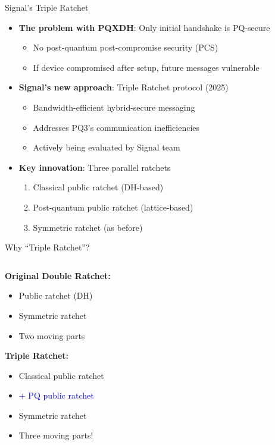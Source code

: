 \documentclass[aspectratio=169, lualatex, handout]{beamer}
\begin{document}
\begin{frame}{Signal's Triple Ratchet}
	\begin{itemize}
		\item \textbf{The problem with PQXDH}: Only initial handshake is PQ-secure
		      \begin{itemize}
			      \item No post-quantum post-compromise security (PCS)
			      \item If device compromised after setup, future messages vulnerable
		      \end{itemize}
		\item \textbf{Signal's new approach}: Triple Ratchet protocol (2025)
		      \begin{itemize}
			      \item Bandwidth-efficient hybrid-secure messaging
			      \item Addresses PQ3's communication inefficiencies
			      \item Actively being evaluated by Signal team
		      \end{itemize}
		\item \textbf{Key innovation}: Three parallel ratchets
		      \begin{enumerate}
			      \item Classical public ratchet (DH-based)
			      \item Post-quantum public ratchet (lattice-based)
			      \item Symmetric ratchet (as before)
		      \end{enumerate}
	\end{itemize}
\end{frame}

\begin{frame}{Why ``Triple Ratchet''?}
	\begin{columns}[c]
		\begin{column}{1\textwidth}
			\textbf{Original Double Ratchet:}
			\begin{itemize}
				\item Public ratchet (DH)
				\item Symmetric ratchet
				\item Two moving parts
			\end{itemize}
			\vspace{5mm}
			\textbf{Triple Ratchet:}
			\begin{itemize}
				\item Classical public ratchet
				\item \textcolor{blue}{+ PQ public ratchet}
				\item Symmetric ratchet
				\item Three moving parts!
			\end{itemize}
		\end{column}
	\end{columns}
\end{frame}
\end{document}
